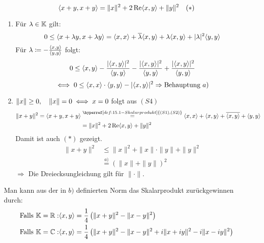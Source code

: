 \begin{bemerkung*}
	\[ \langle x + y, x + y \rangle = \| x\|^{2} + 2 \mathop{\rm Re}\nolimits \langle x, y \rangle + \| y \|^{2} \quad (*) \label{eq:15.2-*} \]
\end{bemerkung*}

\begin{beweis}
	\begin{enumerate}[label=\alph*\upshape)]
		\item Für $\lambda \in \mathbb{K}$ gilt:
			\[ 0 \leq \langle x + \lambda y, x + \lambda y \rangle = \langle x, x \rangle + \overline{\lambda} \langle x, y \rangle + \lambda \langle x, y \rangle + |\lambda|^{2} \langle y, y \rangle \]
			Für $\lambda \coloneqq - \frac{\langle x, y \rangle}{\langle y, y \rangle}$ folgt:
			\[ 0 \leq \langle x, y \rangle - \frac{|\langle x,y \rangle|^{2}}{\langle y, y \rangle} - \frac{|\langle x, y \rangle|^{2}}{\langle y, y \rangle} + \frac{|\langle x, y \rangle|^{2}}{\langle y, y \rangle} \]
			\[ \iff 0 \leq \langle x, x \rangle \cdot \langle y, y \rangle - |\langle x, y \rangle|^{2} \Rightarrow \text{Behauptung } a) \]
		\item $\| x \| \geq 0, \quad \| x \| = 0 \iff x = 0$ folgt aus \hyperref[def:15.1iv]{$(S4)$} \\
			\begin{align*}
				\| x + y \|^{2} = \< x + y, x + y \> & \overset{\hyperref[def:15.1-Skalarprodukt]{(S1), (S2)}}{=} \< x, x \> + \< x, y \> + \overline{\< x, y \>} + \< y, y \> \\
						& = \| x \|^{2} + 2 \Re \< x, y \> + \| y \|^{2}
			\end{align*}
			Damit ist auch \hyperref[eq:15.2-*]{$(*)$} gezeigt.
			\begin{align*}
				\| x + y \|^{2} & \leq \| x \|^{2} + \| x \| \cdot \| y \| + \| y \|^{2} \\
						& \overset{\hyperref[prop:15.2a]{a)}}{=} \left( \| x \| + \| y \| \right)^{2}
			\end{align*}
			$\Rightarrow$ Die Dreiecksungleichung gilt für $\| \cdot \|$.
	\end{enumerate}	
\end{beweis}


\begin{bemerkung} \label{bem:15.3}
	Man kann aus der in \hyperref[prop:15.2b]{$b)$} definierten Norm das Skalarprodukt zurückgewinnen durch:
	\begin{align*}
		\text{Falls } \mathbb{K} = \mathbb{R}: &  \langle x, y \rangle = \frac{1}{4} \left( \| x + y \|^{2} - \| x - y \|^{2} \right) \\
		\text{Falls } \mathbb{K} = \mathbb{C}: &  \langle x, y \rangle = \frac{1}{4} \left( \| x + y \|^{2} - \| x - y \|^{2} + i \| x + i y\|^{2} - i \| x - iy\|^{2} \right)
	\end{align*}
\end{bemerkung}


